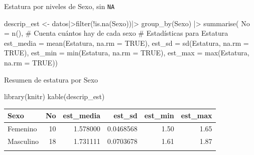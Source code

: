 \documentclass[
  ignorenonframetext,
  aspectratio=169,
  spanish,
]{beamer}
\newenvironment{Shaded}{\begin{snugshade}}{\end{snugshade}}
\newcommand{\AttributeTok}[1]{\textcolor[rgb]{0.40,0.45,0.13}{#1}}
\newcommand{\CommentTok}[1]{\textcolor[rgb]{0.37,0.37,0.37}{#1}}
\newcommand{\ConstantTok}[1]{\textcolor[rgb]{0.56,0.35,0.01}{#1}}
\newcommand{\FunctionTok}[1]{\textcolor[rgb]{0.28,0.35,0.67}{#1}}
\newcommand{\NormalTok}[1]{\textcolor[rgb]{0.00,0.23,0.31}{#1}}
\newcommand{\OtherTok}[1]{\textcolor[rgb]{0.00,0.23,0.31}{#1}}
\newcommand{\SpecialCharTok}[1]{\textcolor[rgb]{0.37,0.37,0.37}{#1}}
\begin{document}
\begin{frame}[fragile]{Estatura por niveles de Sexo, sin \texttt{NA}}
\label{estatura-por-niveles-de-sexo-sin-na}
\begin{Shaded}
\begin{Highlighting}[]
\NormalTok{descrip\_est }\OtherTok{\textless{}{-}}\NormalTok{ datos}\SpecialCharTok{|\textgreater{}}\FunctionTok{filter}\NormalTok{(}\SpecialCharTok{!}\FunctionTok{is.na}\NormalTok{(Sexo))}\SpecialCharTok{|\textgreater{}} 
  \FunctionTok{group\_by}\NormalTok{(Sexo) }\SpecialCharTok{|\textgreater{}} 
  \FunctionTok{summarise}\NormalTok{(}
    \AttributeTok{No =} \FunctionTok{n}\NormalTok{(), }\CommentTok{\# Cuenta cuántos hay de cada sexo}
    \CommentTok{\# Estadísticas para Estatura}
    \AttributeTok{est\_media =} \FunctionTok{mean}\NormalTok{(Estatura, }\AttributeTok{na.rm =} \ConstantTok{TRUE}\NormalTok{),}
    \AttributeTok{est\_sd =} \FunctionTok{sd}\NormalTok{(Estatura, }\AttributeTok{na.rm =} \ConstantTok{TRUE}\NormalTok{),}
    \AttributeTok{est\_min =} \FunctionTok{min}\NormalTok{(Estatura, }\AttributeTok{na.rm =} \ConstantTok{TRUE}\NormalTok{),}
    \AttributeTok{est\_max =} \FunctionTok{max}\NormalTok{(Estatura, }\AttributeTok{na.rm =} \ConstantTok{TRUE}\NormalTok{))}
\end{Highlighting}
\end{Shaded}
\end{frame}

\begin{frame}[fragile]{Resumen de estatura por Sexo}
\label{resumen-de-estatura-por-sexo-1}
\begin{Shaded}
\begin{Highlighting}[]
\FunctionTok{library}\NormalTok{(knitr)}
\FunctionTok{kable}\NormalTok{(descrip\_est)}
\end{Highlighting}
\end{Shaded}

\begin{longtable}[]{@{}lrrrrr@{}}
\toprule\noalign{}
Sexo & No & est\_media & est\_sd & est\_min & est\_max \\
\midrule\noalign{}
\endhead
Femenino & 10 & 1.578000 & 0.0468568 & 1.50 & 1.65 \\
Masculino & 18 & 1.731111 & 0.0703678 & 1.61 & 1.87 \\
\bottomrule\noalign{}
\end{longtable}
\end{frame}
\end{document}
